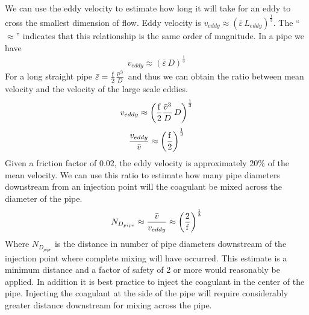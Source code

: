 \documentclass[letterpaper,10pt,english]{sphinxmanual}
\begin{document}
We can use the eddy velocity to estimate how long it will take for an eddy to cross the smallest dimension of flow. Eddy velocity is \(v_{eddy} \approx \left( \bar\varepsilon \, L_{eddy} \right)^\frac{1}{3}\).
The “\(\approx\)” indicates that this relationship is the same order of magnitude. In a pipe we have
\begin{equation}\label{equation:Rapid_Mix/RM_Theory_and_Future_Work:Rapid_Mix/RM_Theory_and_Future_Work:13}
\begin{split}v_{eddy} \approx \left( \bar\varepsilon \, D \right)^\frac{1}{3}\end{split}
\end{equation}
For a long straight pipe
\(\bar\varepsilon = \frac{{\rm f}}{2} \frac{\bar v^3}{D}\) and thus we can obtain the ratio between mean velocity and the velocity of the large scale eddies.
\begin{equation}\label{equation:Rapid_Mix/RM_Theory_and_Future_Work:Rapid_Mix/RM_Theory_and_Future_Work:14}
\begin{split}v_{eddy} \approx \left( \frac{{\rm f}}{2} \frac{\bar v^3}{D} \, D \right)^\frac{1}{3}\end{split}
\end{equation}\begin{equation}\label{equation:Rapid_Mix/RM_Theory_and_Future_Work:Rapid_Mix/RM_Theory_and_Future_Work:15}
\begin{split}\frac{v_{eddy}}{\bar v} \approx \left( \frac{{\rm f}}{2}   \right)^\frac{1}{3}\end{split}
\end{equation}
Given a friction factor of 0.02, the eddy velocity is approximately 20\% of the mean velocity. We can use this ratio to estimate how many pipe diameters downstream from an injection point will the coagulant be mixed across the diameter of the pipe.
\begin{equation}\label{equation:Rapid_Mix/RM_Theory_and_Future_Work:Rapid_Mix/RM_Theory_and_Future_Work:16}
\begin{split}N_{D_{pipe}} \approx \frac{\bar v}{v_{eddy}} \approx \left(\frac{2}{{\rm f}} \right)^\frac{1}{3}\end{split}
\end{equation}
Where \(N_{D_{pipe}}\) is the distance in number of pipe diameters downstream of the injection point where complete mixing will have occurred. This estimate is a minimum distance and a factor of safety of 2 or more would reasonably be applied. In addition it is best practice to inject the coagulant in the center of the pipe. Injecting the coagulant at the side of the pipe will require considerably greater distance downstream for mixing across the pipe.
\end{document}
